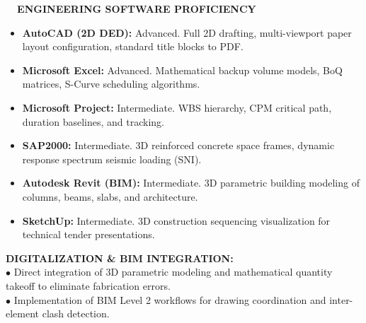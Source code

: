 \documentclass[10pt,a4paper,landscape]{article}
\begin{document}
\hfill
\begin{minipage}[t]{0.32\linewidth}
  \vspace{0pt}
  \begin{tcolorbox}[sharp corners, boxrule=0.8pt, colframe=pborder, colback=white, left=3mm, right=3mm, top=2.5mm, bottom=2.5mm, height=100mm]
    \colorbox{pnavy}{\fontsize{7pt}{8pt}\selectfont\bfseries\color{white}\ \ ENGINEERING SOFTWARE PROFICIENCY\ \ }\\[1.5mm]

    {\fontsize{6.7pt}{8.4pt}\selectfont\color{psteel}
    \begin{itemize}[leftmargin=3mm, itemsep=0.6mm, topsep=0mm]
      \item \textbf{AutoCAD (2D DED):} Advanced. Full 2D drafting, multi-viewport paper layout configuration, standard title blocks to PDF.
      \item \textbf{Microsoft Excel:} Advanced. Mathematical backup volume models, BoQ matrices, S-Curve scheduling algorithms.
      \item \textbf{Microsoft Project:} Intermediate. WBS hierarchy, CPM critical path, duration baselines, and tracking.
      \item \textbf{SAP2000:} Intermediate. 3D reinforced concrete space frames, dynamic response spectrum seismic loading (SNI).
      \item \textbf{Autodesk Revit (BIM):} Intermediate. 3D parametric building modeling of columns, beams, slabs, and architecture.
      \item \textbf{SketchUp:} Intermediate. 3D construction sequencing visualization for technical tender presentations.
    \end{itemize}
    }
  \end{tcolorbox}
  \vspace{2mm}

  \begin{tcolorbox}[sharp corners, boxrule=0.6pt, colframe=pnavy, colback=pbglight, left=2.5mm, right=2.5mm, top=2mm, bottom=2mm, height=52mm]
    {\fontsize{7pt}{8.5pt}\selectfont\bfseries\color{pnavy}DIGITALIZATION \& BIM INTEGRATION:}\\[1.5mm]
    {\fontsize{6.5pt}{8.2pt}\selectfont\color{psteel}
    $\bullet$ Direct integration of 3D parametric modeling and mathematical quantity takeoff to eliminate fabrication errors.\\
    $\bullet$ Implementation of BIM Level 2 workflows for drawing coordination and inter-element clash detection.
    }
  \end{tcolorbox}
\end{minipage}%
\end{document}
